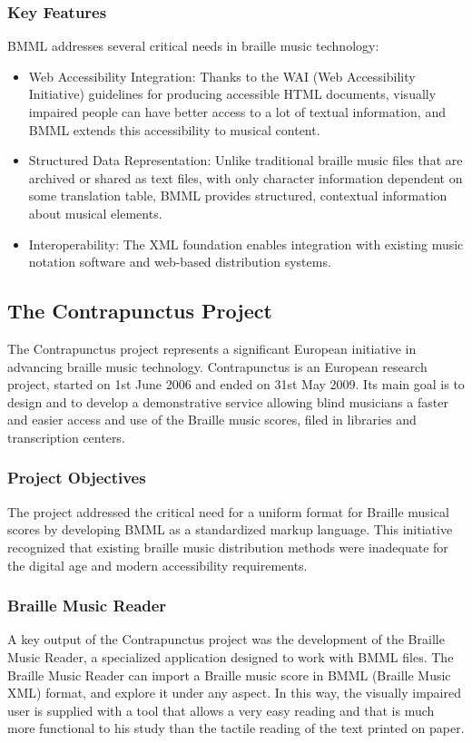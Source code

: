 \subsubsection{Key Features}
BMML addresses several critical needs in braille music technology:
\begin{itemize}
    \item Web Accessibility Integration: Thanks to the WAI (Web Accessibility Initiative) guidelines for producing accessible HTML documents, visually impaired people can have better access to a lot of textual information, and BMML extends this accessibility to musical content.
    \item Structured Data Representation: Unlike traditional braille music files that are archived or shared as text files, with only character information dependent on some translation table, BMML provides structured, contextual information about musical elements.
    \item Interoperability: The XML foundation enables integration with existing music notation software and web-based distribution systems.
\end{itemize}

\subsection{The Contrapunctus Project}

The Contrapunctus project represents a significant European initiative in advancing braille music technology. Contrapunctus is an European research project, started on 1st June 2006 and ended on 31st May 2009. Its main goal is to design and to develop a demonstrative service allowing blind musicians a faster and easier access and use of the Braille music scores, filed in libraries and transcription centers.

\subsubsection{Project Objectives}
The project addressed the critical need for a uniform format for Braille musical scores by developing BMML as a standardized markup language. This initiative recognized that existing braille music distribution methods were inadequate for the digital age and modern accessibility requirements.

\subsubsection{Braille Music Reader}
A key output of the Contrapunctus project was the development of the Braille Music Reader, a specialized application designed to work with BMML files. The Braille Music Reader can import a Braille music score in BMML (Braille Music XML) format, and explore it under any aspect. In this way, the visually impaired user is supplied with a tool that allows a very easy reading and that is much more functional to his study than the tactile reading of the text printed on paper.

